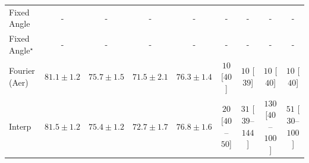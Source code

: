 \begin{tabular}{l|cccc|cccc|}
Fixed Angle & {\cellcolor[HTML]{000000}} \color[HTML]{F1F1F1} {\cellcolor{white}} \color{black} - & {\cellcolor[HTML]{000000}} \color[HTML]{F1F1F1} {\cellcolor{white}} \color{black} - & {\cellcolor[HTML]{000000}} \color[HTML]{F1F1F1} {\cellcolor{white}} \color{black} - & {\cellcolor[HTML]{000000}} \color[HTML]{F1F1F1} {\cellcolor{white}} \color{black} - & {\cellcolor[HTML]{000000}} \color[HTML]{F1F1F1} {\cellcolor{white}} \color{black} - & {\cellcolor[HTML]{000000}} \color[HTML]{F1F1F1} {\cellcolor{white}} \color{black} - & {\cellcolor[HTML]{000000}} \color[HTML]{F1F1F1} {\cellcolor{white}} \color{black} - & {\cellcolor[HTML]{000000}} \color[HTML]{F1F1F1} {\cellcolor{white}} \color{black} - \\
Fixed Angle$^\star$ & {\cellcolor[HTML]{000000}} \color[HTML]{F1F1F1} {\cellcolor{white}} \color{black} - & {\cellcolor[HTML]{000000}} \color[HTML]{F1F1F1} {\cellcolor{white}} \color{black} - & {\cellcolor[HTML]{000000}} \color[HTML]{F1F1F1} {\cellcolor{white}} \color{black} - & {\cellcolor[HTML]{000000}} \color[HTML]{F1F1F1} {\cellcolor{white}} \color{black} - & {\cellcolor[HTML]{000000}} \color[HTML]{F1F1F1} {\cellcolor{white}} \color{black} - & {\cellcolor[HTML]{000000}} \color[HTML]{F1F1F1} {\cellcolor{white}} \color{black} - & {\cellcolor[HTML]{000000}} \color[HTML]{F1F1F1} {\cellcolor{white}} \color{black} - & {\cellcolor[HTML]{000000}} \color[HTML]{F1F1F1} {\cellcolor{white}} \color{black} - \\
Fourier (Aer) & {\cellcolor[HTML]{862E05}} \color[HTML]{F1F1F1} $81.1\pm 1.2$ & {\cellcolor[HTML]{FEB23F}} \color[HTML]{000000} $75.7\pm 1.5$ & {\cellcolor[HTML]{FFFCD7}} \color[HTML]{000000} $71.5\pm 2.1$ & {\cellcolor[HTML]{FE9F2E}} \color[HTML]{000000} $76.3\pm 1.4$ & {\cellcolor[HTML]{FFF6F2}} \color[HTML]{000000} $10$ [$40$] & {\cellcolor[HTML]{FFF6F2}} \color[HTML]{000000} $10$ [$39$] & {\cellcolor[HTML]{FFF6F2}} \color[HTML]{000000} $10$ [$40$] & {\cellcolor[HTML]{FFF6F2}} \color[HTML]{000000} $10$ [$40$] \\
Interp & {\cellcolor[HTML]{782A05}} \color[HTML]{F1F1F1} $81.5\pm 1.2$ & {\cellcolor[HTML]{FEBB47}} \color[HTML]{000000} $75.4\pm 1.2$ & {\cellcolor[HTML]{FFF3B2}} \color[HTML]{000000} $72.7\pm 1.7$ & {\cellcolor[HTML]{FA9125}} \color[HTML]{F1F1F1} $76.8\pm 1.6$ & {\cellcolor[HTML]{FFF3EF}} \color[HTML]{000000} $20$ [$40$--$50$] & {\cellcolor[HTML]{FEF1ED}} \color[HTML]{000000} $31$ [$39$--$144$] & {\cellcolor[HTML]{FDD8D5}} \color[HTML]{000000} $130$ [$40$--$100$] & {\cellcolor[HTML]{FEECE9}} \color[HTML]{000000} $51$ [$30$--$100$] \\

\end{tabular}
